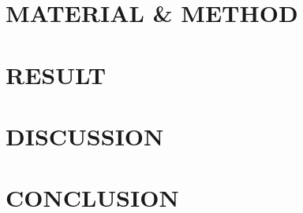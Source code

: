 \documentclass{aes2e}
\begin{document}
\section{MATERIAL \& METHOD}


\section{RESULT}


\section{DISCUSSION}


\section{CONCLUSION}

\end{document}
